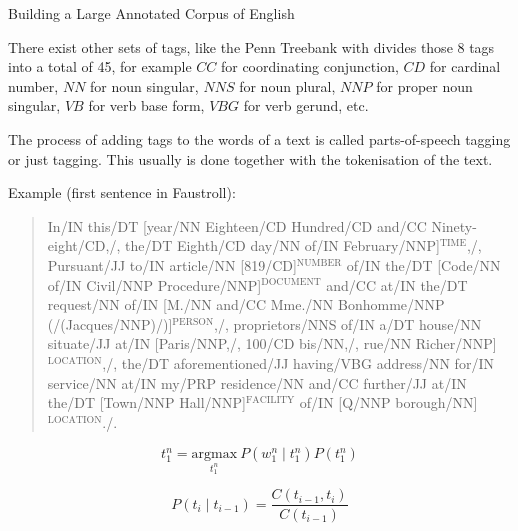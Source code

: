 Building a Large Annotated Corpus of English \autocite{Marcus1993}

There exist other sets of tags, like the Penn Treebank with divides those 8 tags into a total of 45, for example $CC$ for coordinating conjunction, $CD$ for cardinal number, $NN$ for noun singular, $NNS$ for noun plural, $NNP$ for proper noun singular, $VB$ for verb base form, $VBG$ for verb gerund, etc.

The process of adding tags to the words of a text is called parts-of-speech tagging or just tagging. This usually is done together with the tokenisation of the text.

Example (first sentence in Faustroll):

\begin{quote}
  In\slash{}IN this\slash{}DT [year\slash{}NN Eighteen\slash{}CD Hundred\slash{}CD and\slash{}CC Ninety-eight\slash{}CD,\slash{}, the\slash{}DT Eighth\slash{}CD day\slash{}NN of\slash{}IN February\slash{}NNP]$^{\text{TIME}}$,\slash{}, Pursuant\slash{}JJ to\slash{}IN article\slash{}NN [819\slash{}CD]$^{\text{NUMBER}}$ of\slash{}IN the\slash{}DT [Code\slash{}NN of\slash{}IN Civil\slash{}NNP Procedure\slash{}NNP]$^{\text{DOCUMENT}}$ and\slash{}CC at\slash{}IN the\slash{}DT request\slash{}NN of\slash{}IN [M.\slash{}NN and\slash{}CC Mme.\slash{}NN Bonhomme\slash{}NNP (\slash{}(Jacques\slash{}NNP)\slash{})]$^{\text{PERSON}}$,\slash{}, proprietors\slash{}NNS of\slash{}IN a\slash{}DT house\slash{}NN situate\slash{}JJ at\slash{}IN [Paris\slash{}NNP,\slash{}, 100\slash{}CD bis\slash{}NN,\slash{}, rue\slash{}NN Richer\slash{}NNP]$^{\text{LOCATION}}$,\slash{}, the\slash{}DT aforementioned\slash{}JJ having\slash{}VBG address\slash{}NN for\slash{}IN service\slash{}NN at\slash{}IN my\slash{}PRP residence\slash{}NN and\slash{}CC further\slash{}JJ at\slash{}IN the\slash{}DT [Town\slash{}NNP Hall\slash{}NNP]$^{\text{FACILITY}}$ of\slash{}IN [Q\slash{}NNP borough\slash{}NN]$^{\text{LOCATION}}$.\slash{}.
\end{quote}

\begin{equation}
  t_1^n = \underset{t_1^n}{\text{argmax}} \ P(w_1^n \mid t_1^n) P(t_1^n)
  \label{eq:tn1}
\end{equation}

\begin{equation}
  P(t_i \mid t_{i-1}) = \frac{C(t_{i-1},t_i)}{C(t_{i-1})}
  \label{eq:pti}
\end{equation}

